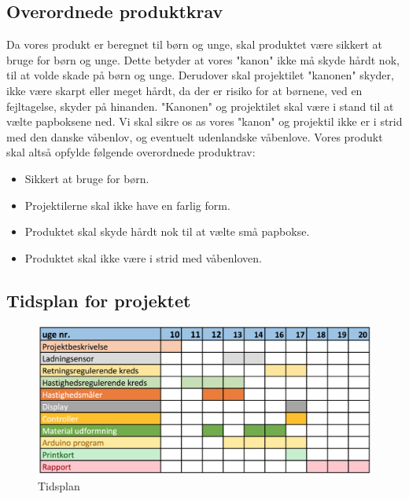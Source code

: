 \subsection{Overordnede produktkrav}
Da vores produkt er beregnet til børn og unge, skal produktet være sikkert at bruge for børn og unge. Dette betyder at vores "kanon" ikke må skyde hårdt nok, til at volde skade på børn og unge. Derudover skal projektilet "kanonen" skyder, ikke være skarpt eller meget hårdt, da der er risiko for at børnene, ved en fejltagelse, skyder på hinanden. "Kanonen" og projektilet skal være i stand til at vælte papboksene ned. Vi skal sikre os as vores "kanon" og projektil ikke er i strid med den danske våbenlov, og eventuelt udenlandske våbenlove.
Vores produkt skal altså opfylde følgende overordnede produktrav:
\begin{itemize}
\item Sikkert at bruge for børn.
\item Projektilerne skal ikke have en farlig form.
\item Produktet skal skyde hårdt nok til at vælte små papbokse.
\item Produktet skal ikke være i strid med våbenloven.
\end{itemize}



\subsection{Tidsplan for projektet}
\begin{figure}[H]
	\centering
    \includegraphics[width=15cm]{figures/2_1projektbeskrivelse/tidsplan.png}
	\caption{Tidsplan}
	\label{fig:tidsplan}
\end{figure}


